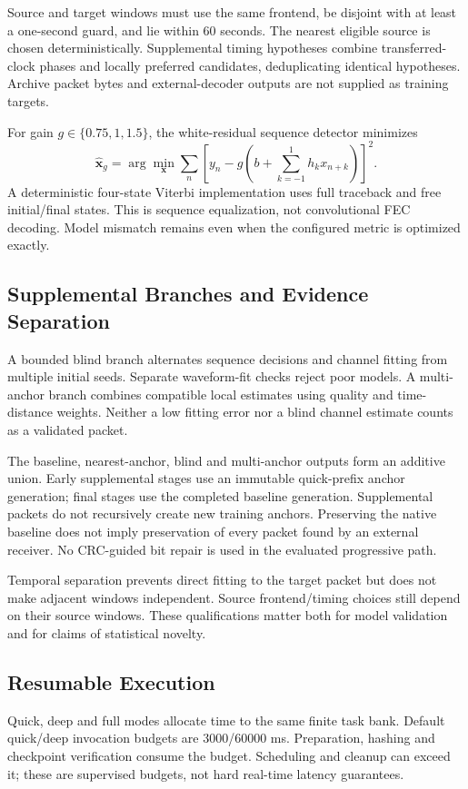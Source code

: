 \documentclass[journal]{IEEEtran}
\begin{document}
Source and target windows must use the same frontend, be disjoint with at least a one-second guard, and lie within 60 seconds. The nearest eligible source is chosen deterministically. Supplemental timing hypotheses combine transferred-clock phases and locally preferred candidates, deduplicating identical hypotheses. Archive packet bytes and external-decoder outputs are not supplied as training targets.

For gain $g\in\{0.75,1,1.5\}$, the white-residual sequence detector minimizes
\begin{equation}
\widehat{\boldsymbol{x}}_g=\arg\min_{\boldsymbol{x}}\sum_n
\left[y_n-g\left(b+\sum_{k=-1}^{1}h_kx_{n+k}\right)\right]^2.
\label{eq:mlse}
\end{equation}
A deterministic four-state Viterbi implementation uses full traceback and free initial/final states. This is sequence equalization, not convolutional FEC decoding. Model mismatch remains even when the configured metric is optimized exactly.

\subsection{Supplemental Branches and Evidence Separation}
A bounded blind branch alternates sequence decisions and channel fitting from multiple initial seeds. Separate waveform-fit checks reject poor models. A multi-anchor branch combines compatible local estimates using quality and time-distance weights. Neither a low fitting error nor a blind channel estimate counts as a validated packet.

The baseline, nearest-anchor, blind and multi-anchor outputs form an additive union. Early supplemental stages use an immutable quick-prefix anchor generation; final stages use the completed baseline generation. Supplemental packets do not recursively create new training anchors. Preserving the native baseline does not imply preservation of every packet found by an external receiver. No CRC-guided bit repair is used in the evaluated progressive path.

Temporal separation prevents direct fitting to the target packet but does not make adjacent windows independent. Source frontend/timing choices still depend on their source windows. These qualifications matter both for model validation and for claims of statistical novelty.

\subsection{Resumable Execution}
Quick, deep and full modes allocate time to the same finite task bank. Default quick/deep invocation budgets are 3000/60000 ms. Preparation, hashing and checkpoint verification consume the budget. Scheduling and cleanup can exceed it; these are supervised budgets, not hard real-time latency guarantees.
\end{document}
